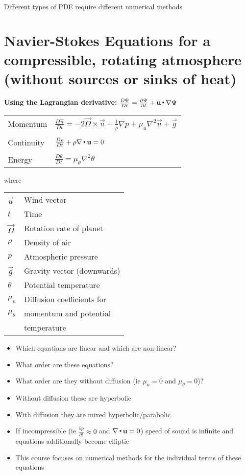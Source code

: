 Different types of PDE require different numerical methods

\section{Navier-Stokes Equations for a compressible, rotating atmosphere
\normalfont\normalsize(without sources or sinks of heat)}

{\bf Using the Lagrangian derivative:}
$\frac{D\Psi}{Dt} = \frac{\partial\Psi}{\partial t} + \mathbf u\,{\scriptscriptstyle \stackrel{\bullet}{{}}}\,\nabla\Psi$

{\renewcommand{\arraystretch}{1.1}
\begin{tabular}{ll}
Momentum & $\frac{D\vec{u}}{Dt} = -2\vec{\Omega}\times\vec{u} - \frac{1}{\rho}\nabla p + \mu_u \nabla^2 \vec{u} + \vec{g}$ \\ \\
Continuity & $\frac{D\rho}{Dt} + \rho\nabla\,{\scriptscriptstyle \stackrel{\bullet}{{}}}\,\mathbf u = 0$\\ \\
Energy     & $\frac{D\theta}{Dt} = \mu_\theta \nabla^2 \theta$\\
\end{tabular}
\hspace{-0.1cm} where
\begin{tabular}{ll}
$\vec{u}$ & Wind vector \\
$t$       & Time \\
$\vec{\Omega}$ & Rotation rate of planet\\
$\rho$         & Density of air\\
$p$            & Atmospheric pressure\\
$\vec{g}$      & Gravity vector (downwards)\\
$\theta$       & Potential temperature\\
$\mu_u$        & Diffusion coefficients for \\
$\mu_\theta$   & momentum and potential \\
               & temperature\\
\end{tabular}}

\begin{itemize}
\item Which equations are linear and which are non-linear?
\item What order are these equations?
\item What order are they without diffusion (ie $\mu_u=0$ and $\mu_\theta=0$)?
\item Without diffusion these are hyperbolic
\item With diffusion they are mixed hyperbolic/parabolic
\item If incompressible (ie $\frac{\partial\rho}{\partial t}\approx 0$ and $\nabla\,{\scriptscriptstyle \stackrel{\bullet}{{}}}\,\mathbf u = 0$)
speed of sound is infinite and equations additionally become elliptic
\item This course focuses on numerical methods for the individual terms of these equations
\end{itemize}

